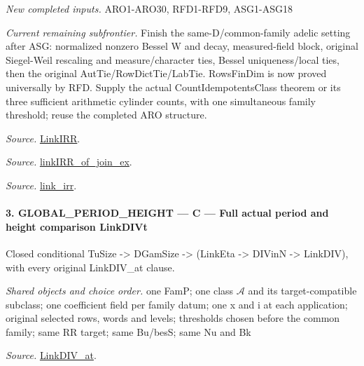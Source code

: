 \documentclass[11pt,a4paper]{article}
\numberwithin{equation}{section}
\theoremstyle{remark}\newtheorem{remark}[theorem]{Remark}
\begin{document}
\emph{New completed inputs.} ARO1-ARO30, RFD1-RFD9, ASG1-ASG18

\emph{Current remaining subfrontier.} Finish the same-D/common-family adelic setting after ASG: normalized nonzero Bessel W and decay, measured-field block, original Siegel-Weil rescaling and measure/character ties, Bessel uniqueness/local ties, then the original AutTie/RowDictTie/LabTie. RowsFinDim is now proved universally by RFD. Supply the actual CountIdempotentsClass theorem or its three sufficient arithmetic cylinder counts, with one simultaneous family threshold; reuse the completed ARO structure.

\emph{Source.} \href{https://github.com/CocoSgt/riemann-hypothesis-lean/blob/7cbf7a0c32fca1badf05931879a37c3f8a2b03b4/src/Formalism/SharpRestriction/GlobalTheoremInputs.lean#L55-L58}{LinkIRR}.

\emph{Source.} \href{https://github.com/CocoSgt/riemann-hypothesis-lean/blob/7cbf7a0c32fca1badf05931879a37c3f8a2b03b4/src/Development/AbelianVarietyTheory/Proofs/GlobalInterpolation/LinkIRROfJoinEx.lean#L17-L38}{linkIRR\_\allowbreak of\_\allowbreak join\_\allowbreak ex}.

\emph{Source.} \href{https://github.com/CocoSgt/riemann-hypothesis-lean/blob/7cbf7a0c32fca1badf05931879a37c3f8a2b03b4/src/Development/AbelianVarietyTheory/Proofs/GlobalInterpolation/LinkIRROfJoinEx.lean#L143-L166}{link\_\allowbreak irr}.



\paragraph{3. GLOBAL\_\allowbreak PERIOD\_\allowbreak HEIGHT — C — Full actual period and height comparison LinkDIVt}

Closed conditional TuSize -> DGamSize -> (LinkEta -> DIVinN -> LinkDIV), with every original LinkDIV\_\allowbreak at clause.

\emph{Shared objects and choice order.} one FamP; one class $\mathcal A$ and its target-compatible subclass; one coefficient field per family datum; one x and i at each application; original selected rows, words and levels; thresholds chosen before the common family; same RR target; same Bu/besS; same Nu and Bk

\emph{Source.} \href{https://github.com/CocoSgt/riemann-hypothesis-lean/blob/7cbf7a0c32fca1badf05931879a37c3f8a2b03b4/src/Formalism/SharpRestriction/GlobalTheoremInputs.lean#L77-L90}{LinkDIV\_\allowbreak at}.
\end{document}
